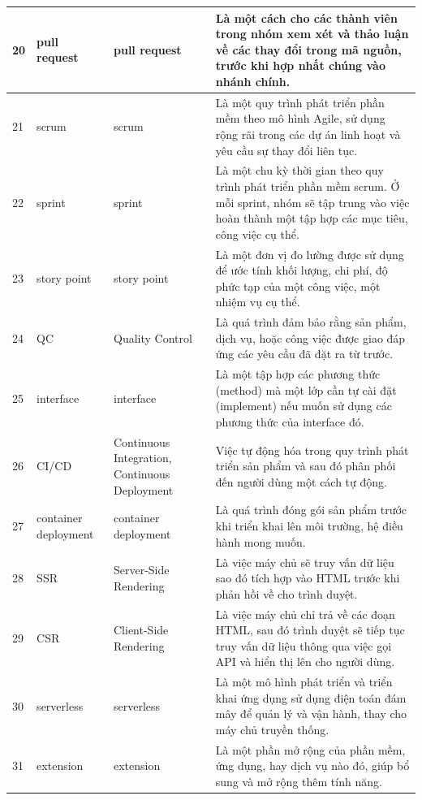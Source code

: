 \begin{center}
\begin{longtable}{|p{1cm}|p{2.75cm}|p{2.75cm}|p{8cm}|}
        \hline
        20 & pull request & pull request & Là một cách cho các thành viên trong nhóm xem xét và thảo luận về các thay đổi trong mã nguồn, trước khi hợp nhất chúng vào nhánh chính. \\ 
        \hline
        21 & scrum & scrum & Là một quy trình phát triển phần mềm theo mô hình Agile, sử dụng rộng rãi trong các dự án linh hoạt và yêu cầu sự thay đổi liên tục. \\ 
        \hline
        22 & sprint & sprint & Là một chu kỳ thời gian theo quy trình phát triển phần mềm scrum. Ở mỗi sprint, nhóm sẽ tập trung vào việc hoàn thành một tập hợp các mục tiêu, công việc cụ thể. \\ 
        \hline
        23 & story point & story point & Là một đơn vị đo lường được sử dụng để ước tính khối lượng, chi phí, độ phức tạp của một công việc, một nhiệm vụ cụ thể. \\ 
        \hline
        24 & QC & Quality Control & Là quá trình đảm bảo rằng sản phẩm, dịch vụ, hoặc công việc được giao đáp ứng các yêu cầu đã đặt ra từ trước. \\ 
        \hline
        25 & interface & interface & Là một tập hợp các phương thức (method) mà một lớp cần tự cài đặt (implement) nếu muốn sử dụng các phương thức của interface đó. \\ 
        \hline
        26 & CI/CD & Continuous Integration, Continuous Deployment & Việc tự động hóa trong quy trình phát triển sản phẩm và sau đó phân phối đến người dùng một cách tự động. \\ 
        \hline
        27 & container deployment & container deployment & Là quá trình đóng gói sản phẩm trước khi triển khai lên môi trường, hệ điều hành mong muốn. \\ 
        \hline
        28 & SSR & Server-Side Rendering & Là việc máy chủ sẽ truy vấn dữ liệu sao đó tích hợp vào HTML trước khi phản hồi về cho trình duyệt. \\ 
        \hline
        29 & CSR & Client-Side Rendering & Là việc máy chủ chỉ trả về các đoạn HTML, sau đó trình duyệt sẽ tiếp tục truy vấn dữ liệu thông qua việc gọi API và hiển thị lên cho người dùng. \\ 
        \hline
        30 & serverless & serverless & Là một mô hình phát triển và triển khai ứng dụng sử dụng điện toán đám mây để quản lý và vận hành, thay cho máy chủ truyền thống. \\
        \hline
        31 & extension & extension & Là một phần mở rộng của phần mềm, ứng dụng, hay dịch vụ nào đó, giúp bổ sung và mở rộng thêm tính năng.  \\ 

\end{longtable}
\end{center}
